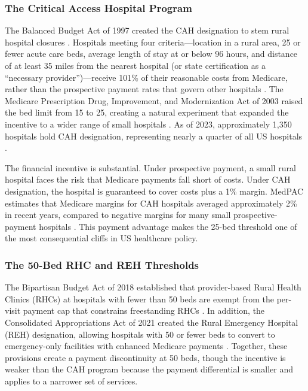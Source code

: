 \documentclass[12pt]{article}
\begin{document}
\subsubsection*{The Critical Access Hospital Program} The Balanced Budget Act of 1997 created the CAH designation to stem rural hospital closures \citep{BBA1997}. Hospitals meeting four criteria---location in a rural area, 25 or fewer acute care beds, average length of stay at or below 96 hours, and distance of at least 35 miles from the nearest hospital (or state certification as a ``necessary provider'')---receive 101\% of their reasonable costs from Medicare, rather than the prospective payment rates that govern other hospitals \citep{GAO2018}. The Medicare Prescription Drug, Improvement, and Modernization Act of 2003 raised the bed limit from 15 to 25, creating a natural experiment that expanded the incentive to a wider range of small hospitals \citep{MMA2003}. As of 2023, approximately 1,350 hospitals hold CAH designation, representing nearly a quarter of all US hospitals \citep{MedPAC2023}.

The financial incentive is substantial. Under prospective payment, a small rural hospital faces the risk that Medicare payments fall short of costs. Under CAH designation, the hospital is guaranteed to cover costs plus a 1\% margin. MedPAC estimates that Medicare margins for CAH hospitals averaged approximately 2\% in recent years, compared to negative margins for many small prospective-payment hospitals \citep{MedPAC2021}. This payment advantage makes the 25-bed threshold one of the most consequential cliffs in US healthcare policy.

\subsubsection*{The 50-Bed RHC and REH Thresholds} The Bipartisan Budget Act of 2018 established that provider-based Rural Health Clinics (RHCs) at hospitals with fewer than 50 beds are exempt from the per-visit payment cap that constrains freestanding RHCs \citep{BBA2018}. In addition, the Consolidated Appropriations Act of 2021 created the Rural Emergency Hospital (REH) designation, allowing hospitals with 50 or fewer beds to convert to emergency-only facilities with enhanced Medicare payments \citep{CAA2021}. Together, these provisions create a payment discontinuity at 50 beds, though the incentive is weaker than the CAH program because the payment differential is smaller and applies to a narrower set of services.
\end{document}
